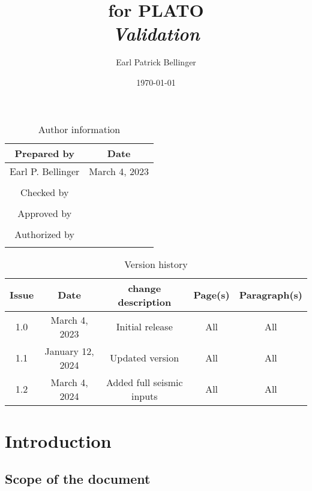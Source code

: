 \documentclass[a4paper, oneside, 11pt, article, english]{memoir}
\author{Earl Patrick Bellinger}
\title{\shorttitle{} for PLATO \\ \Large\textit{Validation}}
\date{\today}
\begin{document}
\maketitle

\begin{table}[htbp]
  \centering
  \caption{Author information}
  \label{tab:author}
  \begin{tabular}{cc}
    \toprule
    Prepared by & Date\\
    \midrule
    Earl P. Bellinger & March 4, 2023 \\
    \\
    Checked by \\
    \midrule
    \\
    Approved by \\
    \midrule
    \\
    Authorized by \\
    \midrule
    \\
    \bottomrule
  \end{tabular}
\end{table}

\begin{table}[htbp]
  \centering
  \caption{Version history}
  \label{tab:version}
  \begin{tabular}{ccccc}
    \toprule
    Issue & Date & \textnumero{} change description & Page(s) & Paragraph(s) \\
    \midrule
    1.0 & March 4, 2023 & Initial release & All & All \\
    1.1 & January 12, 2024 & Updated version & All & All \\
    1.2 & March 4, 2024 & Added full seismic inputs & All & All \\
    \bottomrule
  \end{tabular}
\end{table}


\clearpage
\tableofcontents*
\clearpage


\chapter{Introduction}
\label{chap:intro}

\section{Scope of the document}
\label{sec:scope}
\end{document}
